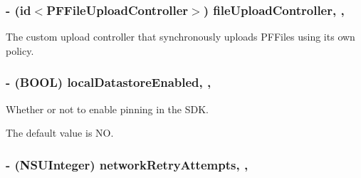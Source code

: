 \subsubsection[{file\+Upload\+Controller}]{\setlength{\rightskip}{0pt plus 5cm}-\/ (id$<${\bf P\+F\+File\+Upload\+Controller}$>$) file\+Upload\+Controller\hspace{0.3cm}{\ttfamily [read]}, {\ttfamily [nonatomic]}, {\ttfamily [strong]}}\label{interface_parse_client_configuration_a5cc5a601fbe36c5acc1b047bf8084b89}
The custom upload controller that synchronously uploads P\+F\+Files using its own policy. \hypertarget{interface_parse_client_configuration_acea892ff4236f17a953bcf4da1236951}{}
\subsubsection[{local\+Datastore\+Enabled}]{\setlength{\rightskip}{0pt plus 5cm}-\/ (B\+O\+O\+L) local\+Datastore\+Enabled\hspace{0.3cm}{\ttfamily [read]}, {\ttfamily [nonatomic]}, {\ttfamily [assign]}}\label{interface_parse_client_configuration_acea892ff4236f17a953bcf4da1236951}




 





Whether or not to enable pinning in the S\+D\+K.

The default value is {\ttfamily N\+O}. \hypertarget{interface_parse_client_configuration_a44d4faba8cf11762f2f065f1f39fbb11}{}
\subsubsection[{network\+Retry\+Attempts}]{\setlength{\rightskip}{0pt plus 5cm}-\/ (N\+S\+U\+Integer) network\+Retry\+Attempts\hspace{0.3cm}{\ttfamily [read]}, {\ttfamily [nonatomic]}, {\ttfamily [assign]}}\label{interface_parse_client_configuration_a44d4faba8cf11762f2f065f1f39fbb11}





